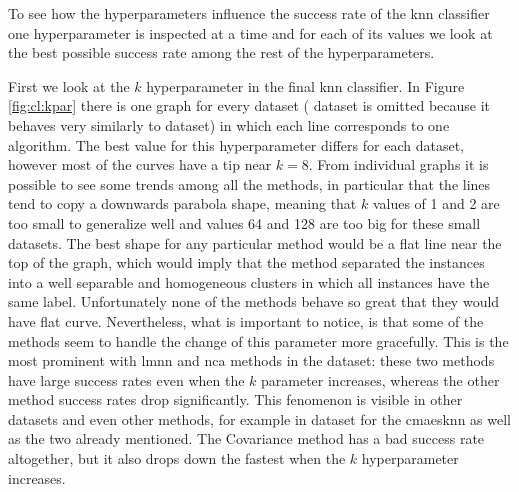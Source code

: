 \documentclass[12pt,a4paper]{report}
\begin{document}


To see how the hyperparameters influence the success rate of the \ac{knn} classifier one hyperparameter is inspected at a time and for each of its values we look at the best possible success rate among the rest of the hyperparameters.

First we look at the $k$ hyperparameter in the final \ac{knn} classifier. In Figure \ref{fig:cl:kpar} there is one graph for every dataset ( dataset is omitted because it behaves very similarly to  dataset) in which each line corresponds to one algorithm. The best value for this hyperparameter differs for each dataset, however most of the curves have a tip near $k=8$. From individual graphs it is possible to see some trends among all the methods, in particular that the lines tend to copy a downwards parabola shape, meaning that $k$ values of 1 and 2 are too small to generalize well and values 64 and 128 are too big for these small datasets. The best shape for any particular method would be a flat line near the top of the graph, which would imply that the method separated the instances into a well separable and homogeneous clusters in which all instances have the same label. Unfortunately none of the methods behave so great that they would have flat curve. Nevertheless, what is important to notice, is that some of the methods seem to handle the change of this parameter more gracefully. This is the most prominent with \ac{lmnn} and \ac{nca} methods in the  dataset: these two methods have large success rates even when the $k$ parameter increases, whereas the other method success rates drop significantly. This fenomenon is visible in other datasets and even other methods, for example in  dataset for the \ac{cmaesknn} as well as the two already mentioned. The Covariance method has a bad success rate altogether, but it also drops down the fastest when the $k$ hyperparameter increases.

\end{document}
